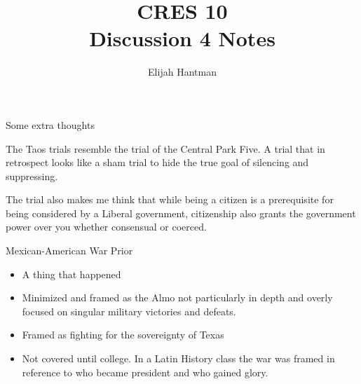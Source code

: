 \documentclass{report}
\title{\Huge{CRES 10}\\Discussion 4 Notes}
\author{\huge{Elijah Hantman}}
\date{}
\begin{document}
\maketitle
\newpage

\begin{description}
    \item Some extra thoughts 
        \begin{mdframed}
            The Taos trials resemble the trial
            of the Central Park Five. A trial that
            in retrospect looks like a sham trial to hide
            the true goal of silencing and suppressing.
        \end{mdframed}
        \begin{mdframed}
            The trial also makes me think that while being
            a citizen is a prerequisite for being considered
            by a Liberal government, citizenship also grants
            the government power over you whether consensual
            or coerced.
        \end{mdframed}
    \item Mexican-American War Prior
        \begin{itemize}
            \item A thing that happened
            \item Minimized and framed as the Almo
                not particularly in depth and
                overly focused on singular military
                victories and defeats.
            \item Framed as fighting for the sovereignty
                of Texas
            \item Not covered until college. In a Latin
                History class the war was framed in
                reference to who became president and who
                gained glory.
        \end{itemize}


\end{description}
\end{document}

